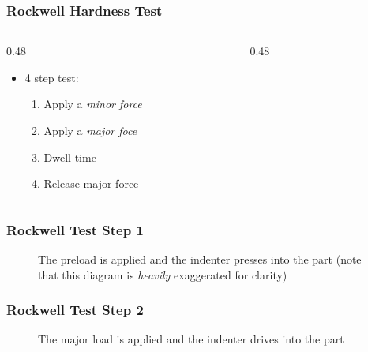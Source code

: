 \begin{frame}
	\frametitle{Rockwell Hardness Test}

    \begin{columns}
        \begin{column}{0.48\linewidth}
            \begin{itemize}[<+- | alert@+>]
                \item 4 step test:
                    \begin{enumerate}
                        \item Apply a \emph{minor force}
                        \item Apply a \emph{major foce}
                        \item Dwell time
                        \item Release major force
                    \end{enumerate}
            \end{itemize}
        \end{column}
        \begin{column}{0.48\linewidth}
            \begin{figure}
                \centering
                \resizebox{\linewidth}{!}{
                    
                }
            \end{figure}
        \end{column}
    \end{columns}
\end{frame}

\begin{frame}
    \frametitle{Rockwell Test Step 1}

    \begin{figure}
        \centering
        \resizebox{\linewidth}{!}{
            
        }

        \vspace{0.5em}
        {\footnotesize The preload is applied and the indenter presses into the part (note that this diagram is \emph{heavily} exaggerated for clarity)\par}
    \end{figure}
\end{frame}

\begin{frame}
    \frametitle{Rockwell Test Step 2}

    \begin{figure}
        \centering
        \resizebox{\linewidth}{!}{
            
        }

        \vspace{0.5em}
        {\footnotesize The major load is applied and the indenter drives into the part\par}
    \end{figure}
\end{frame}

